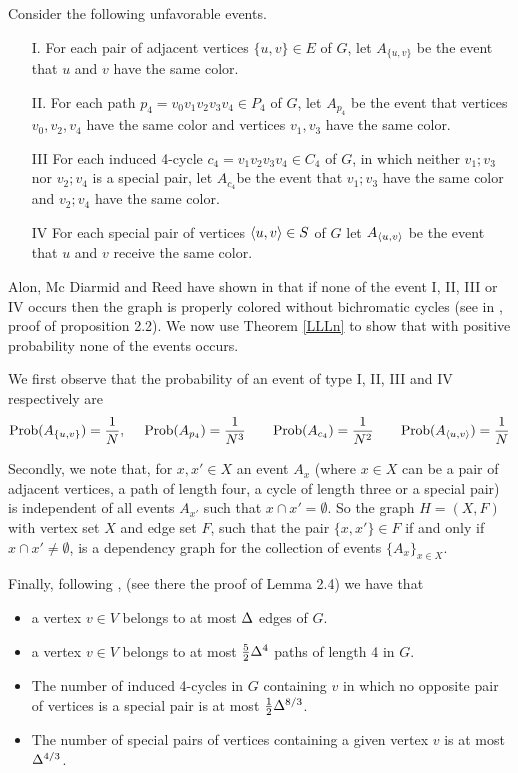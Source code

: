 \documentclass[11pt]{article}
\begin{document}
Consider the following unfavorable events.

 \begin{itemize}
\item[I.] For each pair of adjacent vertices $\{u,v\}\in E$ of $G$, let $A_{\{u,v\}}$ be the
event that $u$ and $v$ have the same color.

\item[II.] For each path  $p_4=v_0v_1v_2v_3v_4\in P_4$ of $G$, let
$A_{p_4}$ be the event that vertices  $v_0, v_2,v_4$ have the same color and  vertices  $v_1,v_3$ have the same color.


\item[III] For each induced 4-cycle $c_4=v_1v_2v_3v_4\in C_4$ of $G$, in which neither $v_1; v_3$
nor $v_2; v_4$ is a special pair, let $A_{c_4}$be the event that  $v_1; v_3$ have the same color and
$v_2; v_4$ have the same color.

\item[IV] For each special pair of vertices $\langle u,v\rangle\in S$ of $G$ let $A_{\langle u,v\rangle}$ be the
event that $u$ and $v$ receive the same color.

\end{itemize}

Alon, Mc Diarmid and  Reed   have shown in \cite{AMR}
that if none of the event I, II,  III or IV occurs then the graph is properly colored without bichromatic cycles (see in \cite{AMR}, proof of proposition 2.2).
We now use Theorem \ref{LLLn} to show that with positive probability  none of the events
occurs.


We first observe that  the probability
of an  event of type I, II, III and IV respectively  are
$$
{\rm Prob}(A_{\{u,v\}})= {1\over N},~~~~
{\rm Prob} (A_{p_4})= {1\over N^3}
~~~~~~
{\rm Prob}(A_{c_4})= {1\over N^2}
~~~~~~
{\rm Prob} (A_{\langle u,v\rangle})= {1\over N}
$$

Secondly, we note that, for $x,x'\in X$ an event $A_x$ (where $x\in X$ can be a pair of adjacent vertices, a path of length four,
a cycle of length three or a special pair)
is independent of all events $A_{x'}$ such that $x\cap x'=\emptyset$. So the graph $H=(X,F)$  with vertex
set $X$ and edge set $F$, such that
the pair $\{x,x'\}\in F$ if and only if  $x\cap x'\neq\emptyset$, is a dependency graph for the collection of events $\{A_x\}_{x\in X}$.

Finally, following \cite{AMR}, (see there the proof of Lemma 2.4) we have that

\begin{itemize}
\item
a vertex $v\in V$ belongs to at most $\Delta$ edges of $G$.
\item
a vertex $v\in V$ belongs to at most %
$ {5\over 2}\Delta^4$  paths of length 4 in $G$.

\item
The number of induced 4-cycles in $G$ containing $v$ in which no opposite
pair of vertices is a special pair is at most ${1\over 2}\Delta^{8/3}$.
\item
 The number of special pairs of vertices containing a given vertex $v$ is at most $\Delta^{4/3}$.
\end{itemize}
\end{document}

